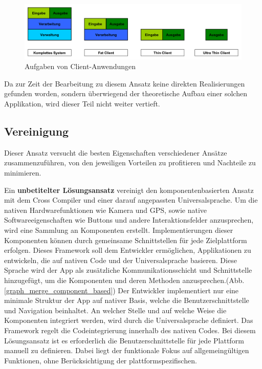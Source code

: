 \begin{figure}[htbp]
	\centering
	\includegraphics[width=1\textwidth]{Bilder/Aufgaben_Endgeraet}
	\caption{Aufgaben von Client-Anwendungen}\label{client_aufgaben}
\end{figure}

Da zur Zeit der Bearbeitung zu diesem Ansatz keine direkten Realisierungen gefunden worden, sondern überwiegend der theoretische Aufbau einer solchen Applikation, wird dieser Teil nicht weiter vertieft.

\subsection{Vereinigung}
Dieser Ansatz versucht die besten Eigenschaften verschiedener Ansätze zusammenzuführen, von den jeweiligen Vorteilen zu profitieren und Nachteile zu minimieren.

\medskip
Ein \textbf{unbetitelter Lösungsansatz} vereinigt den komponentenbasierten Ansatz mit dem Cross Compiler und einer darauf angepassten Universalsprache. Um die nativen Hardwarefunktionen wie Kamera und GPS, sowie native Softwareeigenschaften wie Buttons und andere Interaktionsfelder anzusprechen, wird eine Sammlung an Komponenten erstellt. Implementierungen dieser Komponenten können durch gemeinsame Schnittstellen für jede Zielplattform erfolgen. Dieses Framework soll dem Entwickler ermöglichen, Applikationen zu entwickeln, die auf nativen Code und der Universalsprache basieren. Diese Sprache wird der App als zusätzliche Kommunikationsschicht und Schnittstelle hinzugefügt, um die Komponenten und deren Methoden anzusprechen.(Abb. \ref{graph_merge_component_based}) Der Entwickler implementiert nur eine minimale Struktur der App auf nativer Basis, welche die Benutzerschnittstelle und Navigation beinhaltet. An welcher Stelle und auf welche Weise die Komponenten integriert werden, wird durch die Universalsprache definiert. Das Framework regelt die Codeintegrierung innerhalb des nativen Codes. Bei diesem Lösungsansatz ist es erforderlich die Benutzerschnittstelle für jede Plattform manuell zu definieren. Dabei liegt der funktionale Fokus auf allgemeingültigen Funktionen, ohne Berücksichtigung der plattformspezifischen.

